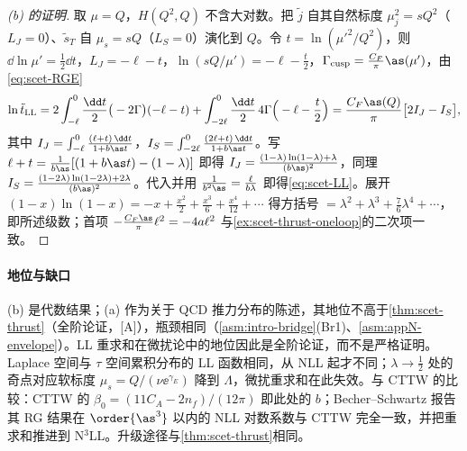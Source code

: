 \begin{proof}[(b) 的证明]
取 $\mu=Q$，$H(Q^2,Q)$ 不含大对数。把 $\tilde j$ 自其自然标度 $\mu_j^2=sQ^2$（$L_J=0$）、$\tilde s_T$ 自 $\mu_s=sQ$（$L_S=0$）演化到 $Q$。令 $t=\ln(\mu'^2/Q^2)$，则 $\dd\ln\mu'=\frac12\dd t$，$L_J=-\ell-t$，$\ln(sQ/\mu')=-\ell-\frac t2$，$\Gamma_{\rm cusp}=\frac{C_F}{\pi}\as(\mu')$，由\cref{eq:scet-RGE}
\[
\ln\tilde t_{\rm LL}=2\int_{-\ell}^{0}\frac{\dd t}{2}\big(-2\Gamma\big)(-\ell-t)+\int_{-2\ell}^{0}\frac{\dd t}{2}\,4\Gamma\Big(-\ell-\frac t2\Big)=\frac{C_F\as(Q)}{\pi}\big[2I_J-I_S\big],
\]
其中 $I_J=\int_{-\ell}^0\frac{(\ell+t)\,\dd t}{1+b\as t}$，$I_S=\int_{-2\ell}^0\frac{(2\ell+t)\,\dd t}{1+b\as t}$。写 $\ell+t=\frac{1}{b\as}[(1+b\as t)-(1-\lambda)]$ 即得 $I_J=\frac{(1-\lambda)\ln(1-\lambda)+\lambda}{(b\as)^2}$，同理 $I_S=\frac{(1-2\lambda)\ln(1-2\lambda)+2\lambda}{(b\as)^2}$。代入并用 $\frac1{b^2\as}=\frac{\ell}{b\lambda}$ 即得\cref{eq:scet-LL}。展开 $(1-x)\ln(1-x)=-x+\frac{x^2}2+\frac{x^3}6+\frac{x^4}{12}+\cdots$ 得方括号 $=\lambda^2+\lambda^3+\frac76\lambda^4+\cdots$，即所述级数；首项 $-\frac{C_F\as}\pi\ell^2=-4a\ell^2$ 与\cref{ex:scet-thrust-oneloop}的二次项一致。%
\end{proof}

\paragraph{地位与缺口}
(b) 是代数结果；(a) 作为关于 QCD 推力分布的陈述，其地位不高于\cref{thm:scet-thrust}（全阶论证，[A]），瓶颈相同（\cref{asm:intro-bridge}(Br1)、\cref{asm:appN-envelope}）。LL 重求和在微扰论中的地位因此是全阶论证，而不是严格证明。Laplace 空间与 $\tau$ 空间累积分布的 LL 函数相同，从 NLL 起才不同；$\lambda\to\frac12$ 处的奇点对应软标度 $\mu_s=Q/(\nu\ee^{\gamma_E})$ 降到 $\Lambda$，微扰重求和在此失效。与 CTTW 的比较：CTTW 的 $\beta_0=(11C_A-2n_f)/(12\pi)$ 即此处的 $b$；Becher--Schwartz 报告其 RG 结果在 $\order{\as^3}$ 以内的 NLL 对数系数与 CTTW 完全一致，并把重求和推进到 N$^3$LL\cite{BecherSchwartz2008}。升级途径与\cref{thm:scet-thrust}相同。
